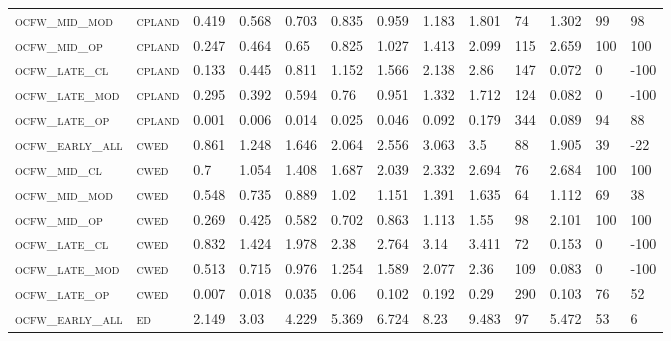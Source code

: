 \begin{landscape}
\begin{center}
\begin{footnotesize}
\begin{longtable}{lllllllllllll}
\textsc{ocfw\_mid\_mod  } & \textsc{cpland    }   & 0.419    & 0.568    & 0.703    & 0.835    & 0.959    & 1.183    & 1.801    & 74  & 1.302    & 99  & 98   \\
\textsc{ocfw\_mid\_op   } & \textsc{cpland    }   & 0.247    & 0.464    & 0.65     & 0.825    & 1.027    & 1.413    & 2.099    & 115 & 2.659    & 100 & 100  \\
\textsc{ocfw\_late\_cl  } & \textsc{cpland    }   & 0.133    & 0.445    & 0.811    & 1.152    & 1.566    & 2.138    & 2.86     & 147 & 0.072    & 0   & -100 \\
\textsc{ocfw\_late\_mod } & \textsc{cpland    }   & 0.295    & 0.392    & 0.594    & 0.76     & 0.951    & 1.332    & 1.712    & 124 & 0.082    & 0   & -100 \\
\textsc{ocfw\_late\_op  } & \textsc{cpland    }   & 0.001    & 0.006    & 0.014    & 0.025    & 0.046    & 0.092    & 0.179    & 344 & 0.089    & 94  & 88   \\
\textsc{ocfw\_early\_all} & \textsc{cwed      }   & 0.861    & 1.248    & 1.646    & 2.064    & 2.556    & 3.063    & 3.5      & 88  & 1.905    & 39  & -22  \\
\textsc{ocfw\_mid\_cl   } & \textsc{cwed      }   & 0.7      & 1.054    & 1.408    & 1.687    & 2.039    & 2.332    & 2.694    & 76  & 2.684    & 100 & 100  \\
\textsc{ocfw\_mid\_mod  } & \textsc{cwed      }   & 0.548    & 0.735    & 0.889    & 1.02     & 1.151    & 1.391    & 1.635    & 64  & 1.112    & 69  & 38   \\
\textsc{ocfw\_mid\_op   } & \textsc{cwed      }   & 0.269    & 0.425    & 0.582    & 0.702    & 0.863    & 1.113    & 1.55     & 98  & 2.101    & 100 & 100  \\
\textsc{ocfw\_late\_cl  } & \textsc{cwed      }   & 0.832    & 1.424    & 1.978    & 2.38     & 2.764    & 3.14     & 3.411    & 72  & 0.153    & 0   & -100 \\
\textsc{ocfw\_late\_mod } & \textsc{cwed      }   & 0.513    & 0.715    & 0.976    & 1.254    & 1.589    & 2.077    & 2.36     & 109 & 0.083    & 0   & -100 \\
\textsc{ocfw\_late\_op  } & \textsc{cwed      }   & 0.007    & 0.018    & 0.035    & 0.06     & 0.102    & 0.192    & 0.29     & 290 & 0.103    & 76  & 52   \\
\textsc{ocfw\_early\_all} & \textsc{ed        }   & 2.149    & 3.03     & 4.229    & 5.369    & 6.724    & 8.23     & 9.483    & 97  & 5.472    & 53  & 6    \\

\end{longtable}
\end{footnotesize}
\end{center}
\end{landscape}
